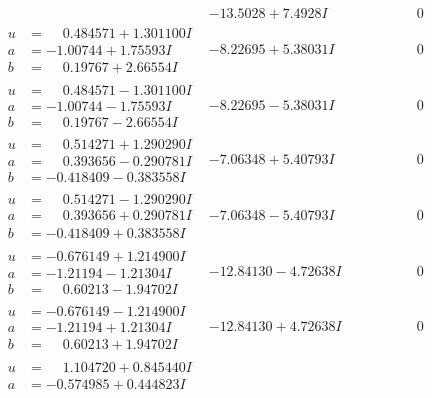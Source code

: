 \documentclass[1p]{elsarticle_modified}
\theoremstyle{definition}
\begin{document}
$$\begin{array}{c|c|c}
 & -13.5028 + 7.4928 I & \phantom{-0.000000 } 0 \\ \hline\begin{aligned}
u &= \phantom{-}0.484571 + 1.301100 I \\
a &= -1.00744 + 1.75593 I \\
b &= \phantom{-}0.19767 + 2.66554 I\end{aligned}
 & -8.22695 + 5.38031 I & \phantom{-0.000000 } 0 \\ \hline\begin{aligned}
u &= \phantom{-}0.484571 - 1.301100 I \\
a &= -1.00744 - 1.75593 I \\
b &= \phantom{-}0.19767 - 2.66554 I\end{aligned}
 & -8.22695 - 5.38031 I & \phantom{-0.000000 } 0 \\ \hline\begin{aligned}
u &= \phantom{-}0.514271 + 1.290290 I \\
a &= \phantom{-}0.393656 - 0.290781 I \\
b &= -0.418409 - 0.383558 I\end{aligned}
 & -7.06348 + 5.40793 I & \phantom{-0.000000 } 0 \\ \hline\begin{aligned}
u &= \phantom{-}0.514271 - 1.290290 I \\
a &= \phantom{-}0.393656 + 0.290781 I \\
b &= -0.418409 + 0.383558 I\end{aligned}
 & -7.06348 - 5.40793 I & \phantom{-0.000000 } 0 \\ \hline\begin{aligned}
u &= -0.676149 + 1.214900 I \\
a &= -1.21194 - 1.21304 I \\
b &= \phantom{-}0.60213 - 1.94702 I\end{aligned}
 & -12.84130 - 4.72638 I & \phantom{-0.000000 } 0 \\ \hline\begin{aligned}
u &= -0.676149 - 1.214900 I \\
a &= -1.21194 + 1.21304 I \\
b &= \phantom{-}0.60213 + 1.94702 I\end{aligned}
 & -12.84130 + 4.72638 I & \phantom{-0.000000 } 0 \\ \hline\begin{aligned}
u &= \phantom{-}1.104720 + 0.845440 I \\
a &= -0.574985 + 0.444823 I \\

\end{aligned}
\end{array}$$
\end{document}
